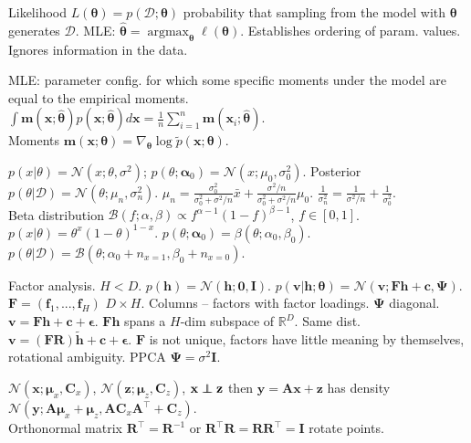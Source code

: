 \documentclass[twocolumn]{article}
\DeclareMathOperator*{\argmax}{argmax}
\newcommand\ind{\protect\mathpalette{\protect\independenT}{\perp}}
\def\independenT#1#2{\mathrel{\rlap{$#1#2$}\mkern2mu{#1#2}}}
\begin{document}
Likelihood $L(\bm{\theta})=p(\mathcal{D};\bm{\theta})$ probability that sampling from the model with $\bm{\theta}$ generates $\mathcal{D}$. MLE: $\bm{\hat{\theta}}=\argmax_{\bm{\theta}}\ell(\bm{\theta})$. Establishes ordering of param. values. Ignores information in the data.

MLE: parameter config. for which some specific moments under the model are equal to the empirical moments.\\
$\int \bm{m}(\bm{x};\bm{\hat{\theta}})p(\bm{x};\bm{\hat{\theta}})d\bm{x}=\frac{1}{n}\sum_{i=1}^{n} \bm{m}(\bm{x}_i;\bm{\hat{\theta}})$.\\
Moments $\bm{m}(\bm{x};\bm{\theta})=\nabla_{\bm{\theta}}\log\tilde{p}(\bm{x};\bm{\theta})$.

$p(x|\theta)=\mathcal{N}(x;\theta,\sigma^2)$; $p(\theta;\bm{\alpha}_0)=\mathcal{N}(x;\mu_0,\sigma^2_0)$.
Posterior $p(\theta|\mathcal{D})=\mathcal{N}(\theta;\mu_n,\sigma^2_n)$. $\mu_n=\frac{\sigma^2_0}{\sigma^2_0+\sigma^2/n}\bar{x}+\frac{\sigma^2/n}{\sigma^2_0+\sigma^2/n}\mu_0$. $\frac{1}{\sigma^2_n}=\frac{1}{\sigma^2/n}+\frac{1}{\sigma^2_0}$.\\
Beta distribution $\mathcal{B}(f;\alpha,\beta)\propto f^{\alpha-1}(1-f)^{\beta-1}$, $f\in[0,1]$.\\
$p(x|\theta)=\theta^x(1-\theta)^{1-x}$. $p(\theta;\bm{\alpha}_0)=\mathcal{\beta}(\theta;\alpha_0,\beta_0)$.\\
$p(\theta|\mathcal{D})=\mathcal{B}(\theta;\alpha_0+n_{x=1},\beta_0+n_{x=0})$.

Factor analysis. $H<D$. $p(\mathbf{h})=\mathcal{N}(\mathbf{h};\mathbf{0},\mathbf{I})$. $p(\mathbf{v}|\mathbf{h};\bm{\theta})=\mathcal{N}(\mathbf{v};\mathbf{F}\mathbf{h}+\mathbf{c},\bm{\Psi})$. $\mathbf{F}=(\mathbf{f}_1,...,\mathbf{f}_H)$ $D\times H$. Columns -- factors with factor loadings. $\bm{\Psi}$ diagonal. $\mathbf{v}=\mathbf{Fh}+\mathbf{c}+\bm{\epsilon}$. $\mathbf{Fh}$ spans a $H$-dim subspace of $\mathbb{R}^D$. Same dist. $\mathbf{v}=(\mathbf{FR})\tilde{\mathbf{h}}+\mathbf{c}+\bm{\epsilon}$. $\mathbf{F}$ is not unique, factors have little meaning by themselves, rotational ambiguity. PPCA $\bm{\Psi}=\sigma^2\mathbf{I}$.

$\mathcal{N}(\mathbf{x};\bm{\mu}_x,\mathbf{C}_x)$, $\mathcal{N}(\mathbf{z};\bm{\mu}_z,\mathbf{C}_z)$, $\mathbf{x}\ind\mathbf{z}$ then $\mathbf{y}=\mathbf{Ax}+\mathbf{z}$ has density $\mathcal{N}(\mathbf{y};\mathbf{A}\bm{\mu}_x+\bm{\mu}_z,\mathbf{A}\mathbf{C}_x\mathbf{A}^\top+\mathbf{C}_z)$.\\
Orthonormal matrix $\mathbf{R}^\top=\mathbf{R}^{-1}$ or $\mathbf{R}^\top\mathbf{R}=\mathbf{R}\mathbf{R}^\top=\mathbf{I}$ rotate points.
\end{document}
